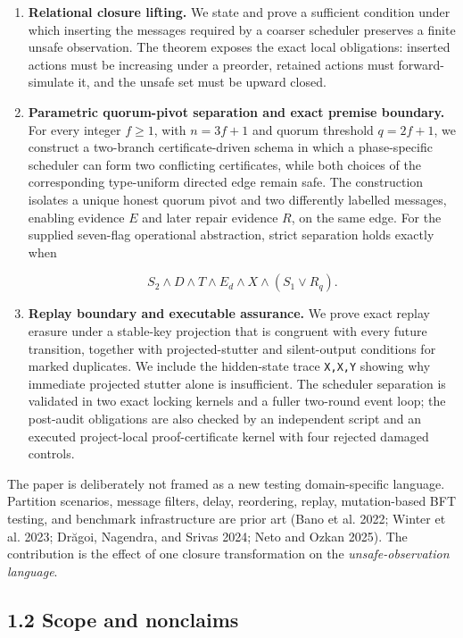 \documentclass[10pt,a4paper]{article}
\begin{document}
\begin{enumerate}
\def\labelenumi{\arabic{enumi}.}
\item
  \textbf{Relational closure lifting.} We state and prove a sufficient
  condition under which inserting the messages required by a coarser
  scheduler preserves a finite unsafe observation. The theorem exposes
  the exact local obligations: inserted actions must be increasing under
  a preorder, retained actions must forward-simulate it, and the unsafe
  set must be upward closed.
\item
  \textbf{Parametric quorum-pivot separation and exact premise
  boundary.} For every integer \(f\geq1\), with \(n=3f+1\) and quorum
  threshold \(q=2f+1\), we construct a two-branch certificate-driven
  schema in which a phase-specific scheduler can form two conflicting
  certificates, while both choices of the corresponding type-uniform
  directed edge remain safe. The construction isolates a unique honest
  quorum pivot and two differently labelled messages, enabling evidence
  \(E\) and later repair evidence \(R\), on the same edge. For the
  supplied seven-flag operational abstraction, strict separation holds
  exactly when

  \[S_2\land D\land T\land E_d\land X\land(S_1\lor R_q).\]
\item
  \textbf{Replay boundary and executable assurance.} We prove exact
  replay erasure under a stable-key projection that is congruent with
  every future transition, together with projected-stutter and
  silent-output conditions for marked duplicates. We include the
  hidden-state trace \texttt{X,X,Y} showing why immediate projected
  stutter alone is insufficient. The scheduler separation is validated
  in two exact locking kernels and a fuller two-round event loop; the
  post-audit obligations are also checked by an independent script and
  an executed project-local proof-certificate kernel with four rejected
  damaged controls.
\end{enumerate}

The paper is deliberately not framed as a new testing domain-specific
language. Partition scenarios, message filters, delay, reordering,
replay, mutation-based BFT testing, and benchmark infrastructure are
prior art (Bano et al. 2022; Winter et al. 2023; Drăgoi, Nagendra, and
Srivas 2024; Neto and Ozkan 2025). The contribution is the effect of one
closure transformation on the \emph{unsafe-observation language}.

\subsection{1.2 Scope and nonclaims}\label{scope-and-nonclaims}
\end{document}
